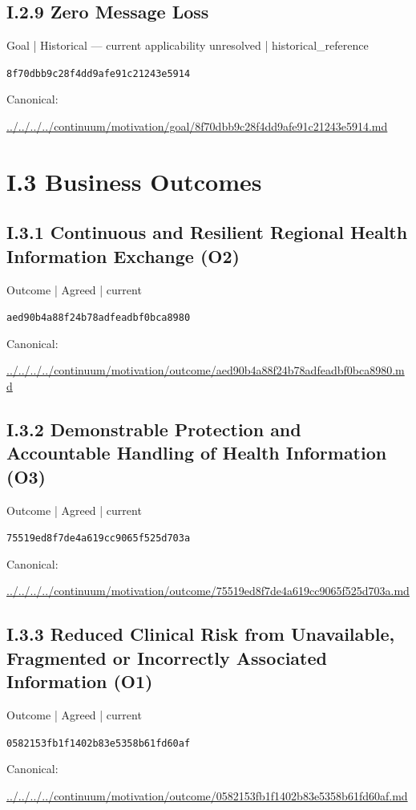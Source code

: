 \documentclass[10pt,a4paper]{article}
\begin{document}
\subsection*{I.2.9 Zero Message Loss}
\label{element-8f70dbb9c28f4dd9afe91c21243e5914}
{\small Goal | Historical — current applicability unresolved | historical\_reference}\par
\texttt{8f70dbb9c28f4dd9afe91c21243e5914}\par
Canonical: \par
{\footnotesize\url{../../../../continuum/motivation/goal/8f70dbb9c28f4dd9afe91c21243e5914.md}}\par
\section*{I.3 Business Outcomes}
\subsection*{I.3.1 Continuous and Resilient Regional Health Information Exchange (O2)}
\label{element-aed90b4a88f24b78adfeadbf0bca8980}
{\small Outcome | Agreed | current}\par
\texttt{aed90b4a88f24b78adfeadbf0bca8980}\par
Canonical: \par
{\footnotesize\url{../../../../continuum/motivation/outcome/aed90b4a88f24b78adfeadbf0bca8980.md}}\par
\subsection*{I.3.2 Demonstrable Protection and Accountable Handling of Health Information (O3)}
\label{element-75519ed8f7de4a619cc9065f525d703a}
{\small Outcome | Agreed | current}\par
\texttt{75519ed8f7de4a619cc9065f525d703a}\par
Canonical: \par
{\footnotesize\url{../../../../continuum/motivation/outcome/75519ed8f7de4a619cc9065f525d703a.md}}\par
\subsection*{I.3.3 Reduced Clinical Risk from Unavailable, Fragmented or Incorrectly Associated Information (O1)}
\label{element-0582153fb1f1402b83e5358b61fd60af}
{\small Outcome | Agreed | current}\par
\texttt{0582153fb1f1402b83e5358b61fd60af}\par
Canonical: \par
{\footnotesize\url{../../../../continuum/motivation/outcome/0582153fb1f1402b83e5358b61fd60af.md}}\par
\end{document}
